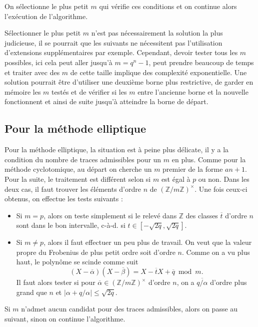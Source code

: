 \documentclass[a4paper]{article} %
\numberwithin{section}{part}
\numberwithin{equation}{section}
\newcommand\zmodninv[1]{(\mathbb{Z}/#1\mathbb{Z})^{\times}}
\newcommand\ZZ{\mathbb{Z}}
\begin{document}
On sélectionne le plus petit $m$ qui vérifie ces conditions et on continue alors
l'exécution de l'algorithme.

\begin{rem}
Sélectionner le plus petit $m$ n'est pas nécessairement la solution la plus
judicieuse, il se pourrait que les suivants ne nécessitent pas l'utilisation
d'extensions supplémentaires par exemple. Cependant, devoir tester tous les $m$
possibles, ici cela peut aller jusqu'à $m = q^n - 1$, peut prendre beaucoup de
temps et traiter avec des $m$ de cette taille implique des complexité
exponentielle. Une solution pourrait être d'utiliser une deuxième borne plus
restrictive, de garder en mémoire les $m$ testés et de vérifier si les $m$ entre
l'ancienne borne et la nouvelle fonctionnent et ainsi de suite jusqu'à atteindre
la borne de départ.
\end{rem}

\subsection{Pour la méthode elliptique}
\label{sec:recherchermell}
Pour la méthode elliptique, la situation est à peine plus délicate, il y a la
condition du nombre de traces admissibles pour un $m$ en plus. Comme pour la 
méthode cyclotomique, au départ on cherche un $m$ premier de la forme $an + 1$. 
Pour la suite, le traitement est différent selon si $m$ est égal à $p$ ou non.
Dans les deux cas, il faut trouver les éléments d'ordre $n$ de $\zmodninv{m}$.
Une fois ceux-ci obtenus, on effectue les tests suivants :
\vspace{0.3cm}
\begin{itemize}
    \item Si $m = p$, alors on teste simplement si le relevé dans $\ZZ$ des
    classes $\overline{t}$ d'ordre $n$ sont dans le bon intervalle, 
    c-à-d. si $t\in[-\sqrt{2q},\sqrt{2q}]$.\vspace{0.2cm}

    \item Si $m\neq p$, alors il faut effectuer un peu plus de travail. On
    veut que la valeur propre du Frobenius de plus petit ordre soit d'ordre $n$.
    Comme on a vu plus haut, le polynôme se scinde comme suit 
    \[(X - \overline{\alpha})(X- \overline{\beta})= X -\overline{t}X + 
    \overline{q}\bmod m.\] 
    Il faut alors tester si pour $\overline{\alpha}\in\zmodninv{m}$ 
    d'ordre $n$, on a $\overline{q/\alpha}$ d'ordre plus grand que $n$ et 
    $\vert{\alpha + q/\alpha}\vert\leq\sqrt{2q}$.
\end{itemize}
\vspace{0.3cm}
Si $m$ n'admet aucun candidat pour des traces admissibles, alors on passe
au suivant, sinon on continue l'algorithme.
\end{document}
